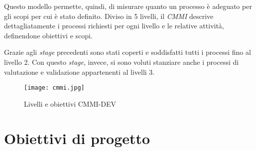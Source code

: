 Questo modello permette, quindi, di misurare quanto un processo è adeguato per gli scopi per cui è stato definito. Diviso in 5 livelli, il \textit{CMMI} descrive dettagliatamente i processi richiesti per ogni livello e le relative attività, definendone obiettivi e scopi.

Grazie agli \textit{stage} precedenti sono stati coperti e soddisfatti tutti i processi fino al livello 2. Con questo \textit{stage}, invece, si sono voluti stanziare anche i processi di valutazione e validazione appartenenti al livelli 3.

\begin{figure}[H]
  \centering
  \texttt{[image: cmmi.jpg]}
  \caption{Livelli e obiettivi CMMI-DEV}
\end{figure}


\section{Obiettivi di progetto}

